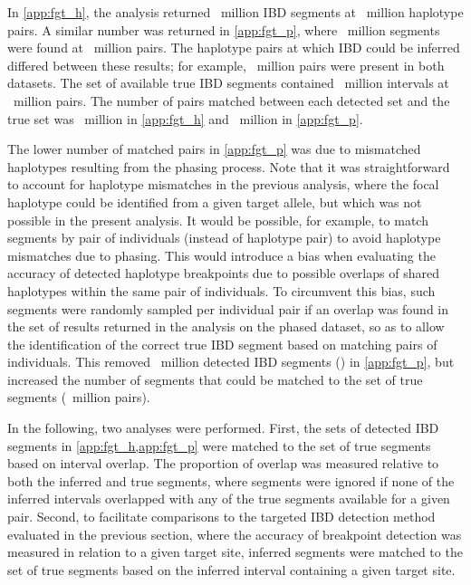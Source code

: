 In \cref{app:fgt_h}, the analysis returned ~million IBD segments at ~million haplotype pairs.
A similar number was returned in \cref{app:fgt_p}, where ~million segments were found at ~million pairs.
The haplotype pairs at which IBD could be inferred differed between these results;
for example, ~million pairs were present in both datasets.
The set of available true IBD segments contained ~million intervals at ~million pairs.
The number of pairs matched between each detected set and the true set was ~million in \ref{app:fgt_h} and ~million in \ref{app:fgt_p}.

The lower number of matched pairs in \cref{app:fgt_p} was due to mismatched haplotypes resulting from the phasing process.
Note that it was straightforward to account for haplotype mismatches in the previous analysis, where the focal haplotype could be identified from a given target allele, but which was not possible in the present analysis.
It would be possible, for example, to match segments by pair of individuals (instead of haplotype pair) to avoid haplotype mismatches due to phasing.
This would introduce a bias when evaluating the accuracy of detected haplotype breakpoints due to possible overlaps of shared haplotypes within the same pair of individuals.
To circumvent this bias, such segments were randomly sampled per individual pair if an overlap was found in the set of results returned in the analysis on the phased dataset, so as to allow the identification of the correct true IBD segment based on matching pairs of individuals.
This removed ~million detected IBD segments () in \cref{app:fgt_p}, but increased the number of segments that could be matched to the set of true segments (~million pairs).

In the following, two analyses were performed.
First, the sets of detected IBD segments in \cref{app:fgt_h,app:fgt_p} were matched to the set of true segments based on interval overlap.
The proportion of overlap was measured relative to both the inferred and true segments, where segments were ignored if none of the inferred intervals overlapped with any of the true segments available for a given pair.
Second, to facilitate comparisons to the targeted IBD detection method evaluated in the previous section, where the accuracy of breakpoint detection was measured in relation to a given target site, inferred segments were matched to the set of true segments based on the inferred interval containing a given target site.


